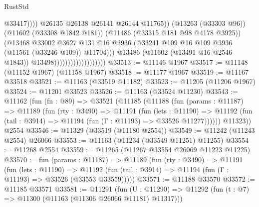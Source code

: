 \begin{lexlean}{RustStd}
\begin{coremodule}
                                                        @33417))))
                                                @26135
                                                @26138
                                                @26141
                                                @26144
                                                @11765))
                                            (@13263 (@33303 @96))
                                            (@11602 (@33308 @1842 @181))
                                            (@11486 (@33315 @181 @98 @4178 @3925))
                                            (@13468
                                              @33002
                                              @3627
                                              @131
                                              @16
                                              @3936
                                              (@33241
                                                @109
                                                @16
                                                @109
                                                @3936
                                                (@11561 (@33246 @109))
                                                @11704)))
                                          @13486
                                          (@11602 (@13491 @16 @2546 @1843))
                                          @13498)))))))))))))))))))
@33513 := @11146 @1967
@33517 := @11148 (@11152 @1967) (@11158 @1967)
@33518 := @11177 @1967
@33519 := @11167 @33518
@33521 := @11163 (@33519 @11182)
@33523 := @11205 (@11206 @1967)
@33524 := @11201 @33523
@33526 := @11163 (@33524 @11230)
@33543 := @11162
    (fun (fn : @89) =>
    @33521
      (@11185
        (@11188
          (fun (params : @11187) =>
          @11189
            (fun (rty : @3490) =>
            @11191
              (fun (lets : @11190) =>
              @11192 (fun (tail : @3914) => @11194 (fun (Γ : @11193) => @33526 @11277))))))
        @11323))
    @2554
@33546 := @11329 (@33519 (@11180 @2554))
@33549 := @11242 (@11243 @2554) @26066
@33553 := @11163 (@11234 (@33549 @11251) @11255)
@33554 := @11268 @2554
@33559 := @11265 (@11267 @33554 @26069 @11223 @11225)
@33570 := fun (params : @11187) =>
  @11189
    (fun (rty : @3490) =>
    @11191
      (fun (lets : @11190) =>
      @11192 (fun (tail : @3914) => @11194 (fun (Γ : @11193) => @33526 (@33553 @33559)))))
@33571 := @11188 @33570
@33572 := @11185 @33571
@33581 := @11291
    (fun (U : @11290) => @11292 (fun (t : @7) => @11300 (@11163 (@11306 @26066 @11181) @11317)))

\end{coremodule}
\end{lexlean}
